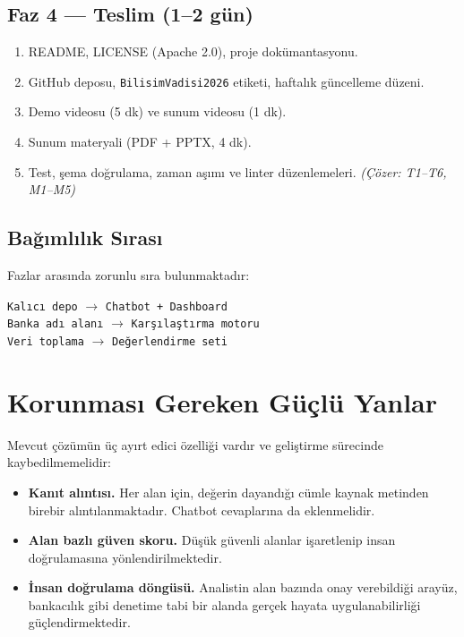 \documentclass[11pt,a4paper]{article}
\begin{document}
\subsection{Faz 4 --- Teslim (1--2 gün)}

\begin{enumerate}[leftmargin=1.2cm,itemsep=3pt]
  \item README, LICENSE (Apache 2.0), proje dokümantasyonu.
  \item GitHub deposu, \texttt{BilisimVadisi2026} etiketi, haftalık güncelleme
        düzeni.
  \item Demo videosu (5 dk) ve sunum videosu (1 dk).
  \item Sunum materyali (PDF + PPTX, 4 dk).
  \item Test, şema doğrulama, zaman aşımı ve linter düzenlemeleri.
        \emph{(Çözer: T1--T6, M1--M5)}
\end{enumerate}

\subsection{Bağımlılık Sırası}

Fazlar arasında zorunlu sıra bulunmaktadır:

\begin{center}
\texttt{Kalıcı depo} $\rightarrow$ \texttt{Chatbot + Dashboard}\\[2pt]
\texttt{Banka adı alanı} $\rightarrow$ \texttt{Karşılaştırma motoru}\\[2pt]
\texttt{Veri toplama} $\rightarrow$ \texttt{Değerlendirme seti}
\end{center}

\section{Korunması Gereken Güçlü Yanlar}

Mevcut çözümün üç ayırt edici özelliği vardır ve geliştirme sürecinde
kaybedilmemelidir:

\begin{itemize}[leftmargin=1.2cm,itemsep=3pt]
  \item \textbf{Kanıt alıntısı.} Her alan için, değerin dayandığı cümle kaynak
        metinden birebir alıntılanmaktadır. Chatbot cevaplarına da eklenmelidir.
  \item \textbf{Alan bazlı güven skoru.} Düşük güvenli alanlar işaretlenip insan
        doğrulamasına yönlendirilmektedir.
  \item \textbf{İnsan doğrulama döngüsü.} Analistin alan bazında onay verebildiği
        arayüz, bankacılık gibi denetime tabi bir alanda gerçek hayata
        uygulanabilirliği güçlendirmektedir.
\end{itemize}
\end{document}
